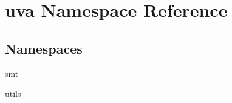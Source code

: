 \hypertarget{namespaceuva}{}\section{uva Namespace Reference}
\label{namespaceuva}
\subsection*{Namespaces}
\begin{DoxyCompactItemize}
\item 
 \hyperlink{namespaceuva_1_1smt}{smt}
\item 
 \hyperlink{namespaceuva_1_1utils}{utils}
\end{DoxyCompactItemize}
